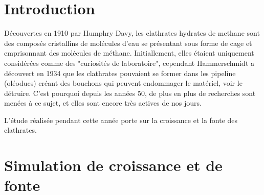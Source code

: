 \section{Introduction}
Découvertes en 1910 par Humphry Davy, les clathrates hydrates de methane sont des composés cristallins de molécules d'eau se présentant sous forme de cage et emprisonnant des molécules de méthane. Initiallement, elles étaient uniquement considérées comme des "curiosités de laboratoire", cependant Hammerschmidt a découvert en 1934 que les clathrates pouvaient se former dans les pipeline (oléoducs) créant des bouchons qui peuvent endommager le matériel, voir le détruire. C'est pourquoi depuis les années 50, de plus en plus de recherches sont menées à ce sujet, et elles sont encore très actives de nos jours.

L'étude réalisée pendant cette année porte sur la croissance et la fonte des clathrates. 

\section{Simulation de croissance et de fonte}

